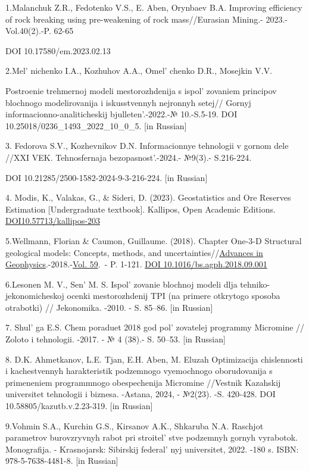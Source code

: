 1.Malanchuk Z.R., Fedotenko V.S., E. Aben, Orynbaev B.A. Improving
efficiency of rock breaking using pre-weakening of rock mass//Eurasian
Mining.- 2023.-Vol.40(2).-P. 62-65

DOI 10.17580/em.2023.02.13

2.Mel' nichenko I.A., Kozhuhov A.A.,
Omel' chenko D.R., Mosejkin V.V.

Postroenie trehmernoj modeli mestorozhdenija s
ispol' zovaniem principov blochnogo modelirovanija i
iskusstvennyh nejronnyh setej// Gornyj informacionno-analiticheskij
bjulleten'.-2022.-№ 10.-S.5-19. DOI
10.25018/0236\_1493\_2022\_10\_0\_5. {[}in Russian{]}

3. Fedorova S.V., Kozhevnikov D.N. Informacionnye tehnologii v gornom
dele //XXI VEK. Tehnosfernaja bezopasnost'.-2024.-
№9(3).- S.216-224.

DOI 10.21285/2500-1582-2024-9-3-216-224. {[}in Russian{]}

4. Modis, K., Valakas, G., \& Sideri, D. (2023). Geostatistics and Ore
Reserves Estimation {[}Undergraduate textbook{]}. Kallipos, Open
Academic Editions.
\href{http://dx.doi.org/10.57713/kallipos-203}{DOI10.57713/kallipos-203}

5.Wellmann, Florian \& Caumon, Guillaume. (2018). Chapter One-3-D
Structural geological models: Concepts, methods, and
uncertainties//\href{https://www.sciencedirect.com/bookseries/advances-in-geophysics}{Advances
in
Geophysics}.-2018.-\href{https://www.sciencedirect.com/bookseries/advances-in-geophysics/vol/59/suppl/C}{Vol.
59}.~- P. 1-121.
\href{http://dx.doi.org/10.1016/bs.agph.2018.09.001}{DOI
10.1016/bs.agph.2018.09.001} \hl{}

6.Lesonen M. V., Sen'{} M. S.
Ispol' zovanie blochnoj modeli dlja
tehniko-jekonomicheskoj ocenki mestorozhdenij TPI (na primere otkrytogo
sposoba otrabotki) // Jekonomika. -2010. - S. 85--86. {[}in Russian{]}

7. Shul' ga E.S. Chem poraduet 2018 god
pol' zovatelej programmy Micromine // Zoloto i
tehnologii. -2017. - № 4 (38).- S. 50--53. {[}in Russian{]}

8. D.K. Ahmetkanov, L.E. Tjan, E.H. Aben, M. Eluzah Optimizacija
chislennosti i kachestvennyh harakteristik podzemnogo vyemochnogo
oborudovanija s primeneniem programmnogo obespechenija Micromine
//Vestnik Kazahskij universitet tehnologii i biznesa. -Astana, 2024, -
№2(23). -S. 420-428. DOI 10.58805/kazutb.v.2.23-319. {[}in Russian{]}

9.Vohmin S.A., Kurchin G.S., Kirsanov A.K., Shkaruba N.A. Raschjot
parametrov burovzryvnyh rabot pri stroitel' stve
podzemnyh gornyh vyrabotok. Monografija. - Krasnojarsk: Sibirskij
federal' nyj universitet, 2022. -180 s. ISBN:
978-5-7638-4481-8. {[}in Russian{]}

